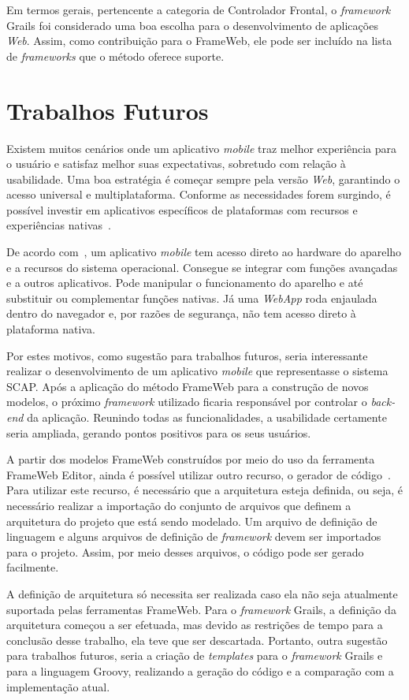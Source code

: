 Em termos gerais, pertencente a categoria de Controlador Frontal, o \textit{framework} Grails foi considerado uma boa escolha para o desenvolvimento de aplicações \textit{Web}. Assim, como contribuição para o FrameWeb, ele pode ser incluído na lista de \textit{frameworks} que o método oferece suporte.

\section{Trabalhos Futuros}
\label{sec-conclusoes-trabalhos-futuros}

Existem muitos cenários onde um aplicativo \textit{mobile} traz melhor experiência para o usuário e satisfaz melhor suas expectativas, sobretudo com relação à usabilidade. Uma boa estratégia é começar sempre pela versão \textit{Web}, garantindo o acesso universal e multiplataforma. Conforme as necessidades forem surgindo, é possível investir em aplicativos específicos de plataformas com recursos e experiências nativas~\cite{lopes:awm14}.

De acordo com~, um aplicativo \textit{mobile} tem acesso direto ao hardware do aparelho e a recursos do sistema operacional. Consegue se integrar com funções avançadas e a outros aplicativos. Pode manipular o funcionamento do aparelho e até substituir ou complementar funções nativas. Já uma \textit{WebApp} roda enjaulada dentro do navegador e, por razões de segurança, não tem acesso direto à plataforma nativa.

Por estes motivos, como sugestão para trabalhos futuros, seria interessante realizar o desenvolvimento de um aplicativo \textit{mobile} que representasse o sistema SCAP. Após a aplicação do método FrameWeb para a construção de novos modelos, o próximo \textit{framework} utilizado ficaria responsável por controlar o \textit{back-end} da aplicação. Reunindo todas as funcionalidades, a usabilidade certamente seria ampliada, gerando pontos positivos para os seus usuários.

A partir dos modelos FrameWeb construídos por meio do uso da ferramenta FrameWeb Editor, ainda é possível utilizar outro recurso, o gerador de código~\cite{almeida-et-al:webmedia17}. Para utilizar este recurso, é necessário que a arquitetura esteja definida, ou seja, é necessário realizar a importação do conjunto de arquivos que definem a arquitetura do projeto que está sendo modelado. Um arquivo de definição de linguagem e alguns arquivos de definição de \textit{framework} devem ser importados para o projeto. Assim, por meio desses arquivos, o código pode ser gerado facilmente.

A definição de arquitetura só necessita ser realizada caso ela não seja atualmente suportada pelas ferramentas FrameWeb. Para o \textit{framework} Grails, a definição da arquitetura começou a ser efetuada, mas devido as restrições de tempo para a conclusão desse trabalho, ela teve que ser descartada. Portanto, outra sugestão para trabalhos futuros, seria a criação de \textit{templates} para o \textit{framework} Grails e para a linguagem Groovy, realizando a geração do código e a comparação com a implementação atual.          

